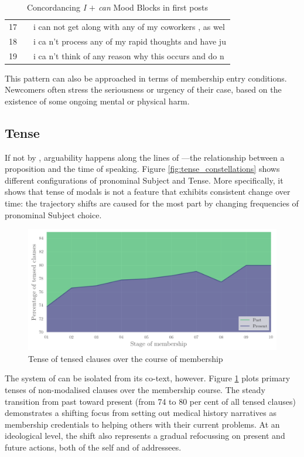 \begin{table}[htb]
\begin{tabular}{lrl}
    17 &                                      &  i can not get along with any of my coworkers , as wel\\
    18 &                                      &  i ca n't process any of my rapid thoughts and have ju\\
    19 &                                      &  i ca n't think of any reason why this occurs and do n\\
    \bottomrule
    \end{tabular}
    \caption[Concordancing \emph{I $+$ can} Mood Blocks]{Concordancing \emph{I $+$ can} Mood Blocks in first \glspl{post}}
    \label{tab:conc_i_can_first}
    \end{table}
%
This pattern can also be approached in terms of membership entry conditions. Newcomers often stress the seriousness or urgency of their case, based on the existence of some ongoing mental or physical harm.

\subsection{Tense}

\FloatBarrier

If not by , arguability happens along the lines of ---the relationship between a proposition and the time of speaking. Figure \ref{fig:tense_constellations} shows different configurations of pronominal Subject and Tense. More specifically, it shows that tense of modals is not a feature that exhibits consistent change over time: the trajectory shifts are caused for the most part by changing frequencies of pronominal Subject choice.

\begin{figure}[htb]
\centering
\includegraphics[width=.7\textwidth]{../images/tense-area.png}
\caption{Tense of tensed clauses over the course of membership}
\label{fig:tense-area}
\end{figure}
%
The system of  can be isolated from its co\hyp{}text, however. Figure \ref{fig:tense-area} plots primary tenses of non\hyp{}modalised clauses over the membership course. The steady transition from past toward present (from 74 to 80 per cent of all tensed clauses) demonstrates a shifting focus from setting out medical history narratives as membership credentials to helping others with their current problems. At an ideological level, the shift also represents a gradual refocussing on present and future actions, both of the self and of addressees.

